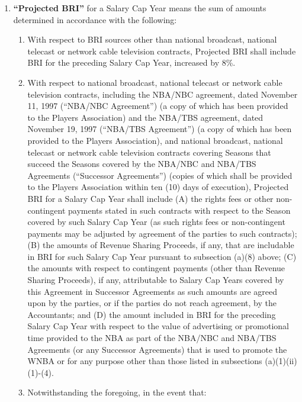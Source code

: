 \documentclass[
]{book}
\providecommand{\tightlist}{%
  \setlength{\itemsep}{0pt}\setlength{\parskip}{0pt}}
\begin{document}
\begin{enumerate}
\begin{enumerate}
  \end{enumerate}
\item
  \textbf{``Projected BRI''} for a Salary Cap Year means the sum of amounts determined in accordance with the following:

  \begin{enumerate}
  \def\labelenumii{(\arabic{enumii})}
  \tightlist
  \item
    With respect to BRI sources other than national broadcast, national telecast or network cable television contracts, Projected BRI shall include BRI for the preceding Salary Cap Year, increased by 8\%.
  \item
    With respect to national broadcast, national telecast or network cable television contracts, including the NBA/NBC agreement, dated November 11, 1997 (``NBA/NBC Agreement'') (a copy of which has been provided to the Players Association) and the NBA/TBS agreement, dated November 19, 1997 (``NBA/TBS Agreement'') (a copy of which has been provided to the Players Association), and national broadcast, national telecast or network cable television contracts covering Seasons that succeed the Seasons covered by the NBA/NBC and NBA/TBS Agreements (``Successor Agreements'') (copies of which shall be provided to the Players Association within ten (10) days of execution), Projected BRI for a Salary Cap Year shall include (A) the rights fees or other non-contingent payments stated in such contracts with respect to the Season covered by such Salary Cap Year (as such rights fees or non-contingent payments may be adjusted by agreement of the parties to such contracts); (B) the amounts of Revenue Sharing Proceeds, if any, that are includable in BRI for such Salary Cap Year pursuant to subsection (a)(8) above; (C) the amounts with respect to contingent payments (other than Revenue Sharing Proceeds), if any, attributable to Salary Cap Years covered by this Agreement in Successor Agreements as such amounts are agreed upon by the parties, or if the parties do not reach agreement, by the Accountants; and (D) the amount included in BRI for the preceding Salary Cap Year with respect to the value of advertising or promotional time provided to the NBA as part of the NBA/NBC and NBA/TBS Agreements (or any Successor Agreements) that is used to promote the WNBA or for any purpose other than those listed in subsections (a)(1)(ii)(1)-(4).
  \item
    Notwithstanding the foregoing, in the event that:


\end{enumerate}
\end{enumerate}
\end{document}
